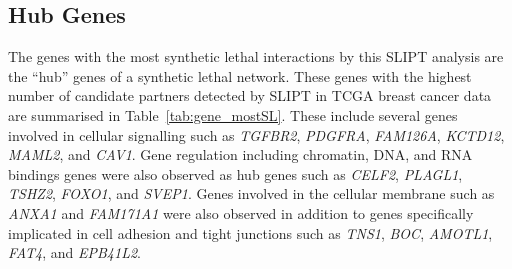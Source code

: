 \FloatBarrier

\subsection{Hub Genes}

The genes with the most \gls{synthetic lethal} interactions by this \gls{SLIPT} analysis are the ``hub'' genes of a \gls{synthetic lethal} network. These genes with the highest number of candidate partners detected by \gls{SLIPT} in \gls{TCGA} breast cancer  data are summarised in Table~\ref{tab:gene_mostSL}.  These include several genes involved in cellular signalling such as \textit{TGFBR2}, \textit{PDGFRA}, \textit{FAM126A}, \textit{KCTD12}, \textit{MAML2}, and \textit{CAV1}. Gene regulation including chromatin, \acrshort{DNA}, and \acrshort{RNA} bindings genes were also observed as hub genes such as \textit{CELF2}, \textit{PLAGL1}, \textit{TSHZ2}, \textit{FOXO1}, and \textit{SVEP1}. Genes involved in the cellular membrane such as \textit{ANXA1} and \textit{FAM171A1} were also observed in addition to genes specifically implicated in cell adhesion and tight junctions such as \textit{TNS1}, \textit{BOC}, \textit{AMOTL1}, \textit{FAT4}, and \textit{EPB41L2}.

